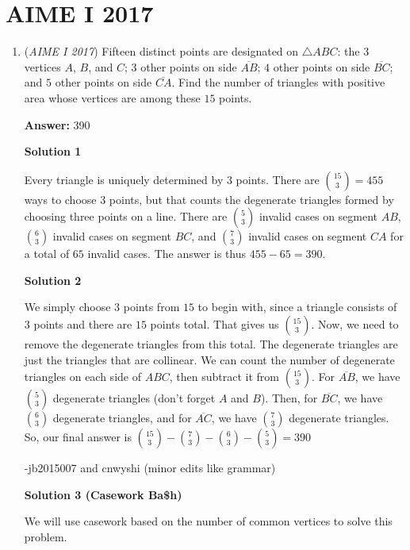 \section{AIME I 2017}
        \begin{enumerate}
        	\item (\textit{AIME I 2017}) Fifteen distinct points are designated on $\triangle ABC$: the 3 vertices $A$, $B$, and $C$; $3$ other points on side $\overline{AB}$; $4$ other points on side $\overline{BC}$; and $5$ other points on side $\overline{CA}$. Find the number of triangles with positive area whose vertices are among these $15$ points.


 
 \textbf{Answer: }390



\textbf{Solution 1}

Every triangle is uniquely determined by 3 points. There are $\binom{15}{3}=455$ ways to choose 3 points, but that counts the degenerate triangles formed by choosing three points on a line. There are $\binom{5}{3}$ invalid cases on segment $AB$, $\binom{6}{3}$ invalid cases on segment $BC$, and $\binom{7}{3}$ invalid cases on segment $CA$ for a total of $65$ invalid cases. The answer is thus $455-65=\boxed{390}$.

 



\textbf{Solution 2}

We simply choose $3$ points from $15$ to begin with, since a triangle consists of $3$ points and there are $15$ points total. That gives us $\binom{15}{3}$. Now, we need to remove the degenerate triangles from this total. The degenerate triangles are just the triangles that are collinear. We can count the number of degenerate triangles on each side of $ABC$, then subtract it from $\binom{15}{3}$. For $\overline{AB}$, we have $\binom{5}{3}$ degenerate triangles (don't forget $A$ and $B$). Then, for $\overline{BC}$, we have $\binom{6}{3}$ degenerate triangles, and for $\overline{AC}$, we have $\binom{7}{3}$ degenerate triangles. So, our final answer is $\binom{15}{3} - \binom{7}{3} - \binom{6}{3} - \binom{5}{3} = \boxed{390}$

 -jb2015007 and cnwyshi (minor edits like grammar)

 



\textbf{Solution 3 (Casework Ba\$h)}

We will use casework based on the number of common vertices to solve this problem.


\end{enumerate}
